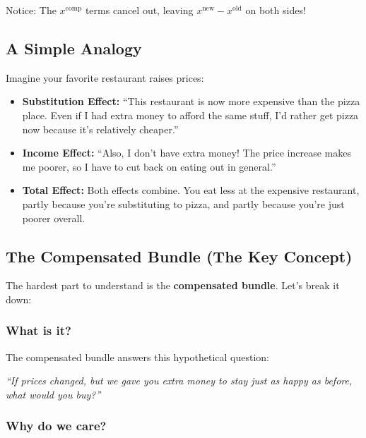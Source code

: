 \documentclass[11pt]{article}
\begin{document}
Notice: The $x^{\text{comp}}$ terms cancel out, leaving $x^{\text{new}} - x^{\text{old}}$ on both sides!

\subsection{A Simple Analogy}

Imagine your favorite restaurant raises prices:

\begin{itemize}[leftmargin=2cm]
    \item \textbf{Substitution Effect:} ``This restaurant is now more expensive than the pizza place. Even if I had extra money to afford the same stuff, I'd rather get pizza now because it's relatively cheaper.''

    \item \textbf{Income Effect:} ``Also, I don't have extra money! The price increase makes me poorer, so I have to cut back on eating out in general.''

    \item \textbf{Total Effect:} Both effects combine. You eat less at the expensive restaurant, partly because you're substituting to pizza, and partly because you're just poorer overall.
\end{itemize}

\subsection{The Compensated Bundle (The Key Concept)}

The hardest part to understand is the \textbf{compensated bundle}. Let's break it down:

\subsubsection{What is it?}

The compensated bundle answers this hypothetical question:

\begin{center}
\textit{``If prices changed, but we gave you extra money to stay just as happy as before, what would you buy?''}
\end{center}

\subsubsection{Why do we care?}
\end{document}
